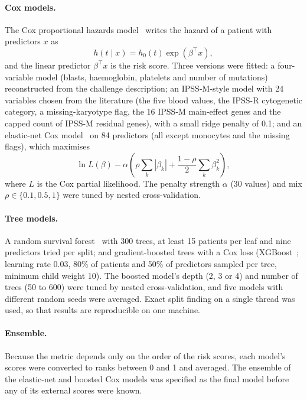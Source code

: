 \documentclass[10pt,letterpaper]{article}
\begin{document}
\paragraph*{Cox models.} The Cox proportional hazards model~\cite{cox1972} writes the hazard
of a patient with predictors $x$ as
\begin{equation}
h(t \mid x) = h_0(t)\exp\left(\beta^{\top} x\right),
\label{eq:cox}
\end{equation}
and the linear predictor $\beta^{\top} x$ is the risk score. Three versions were fitted: a
four-variable model (blasts, haemoglobin, platelets and number of mutations) reconstructed
from the challenge description; an IPSS-M-style model with 24 variables chosen from the
literature (the five blood values, the IPSS-R cytogenetic category, a missing-karyotype
flag, the 16 IPSS-M main-effect genes and the capped count of IPSS-M residual genes), with
a small ridge penalty of 0.1; and an elastic-net Cox model~\cite{zou2005,simon2011} on 84
predictors (all except monocytes and the missing flags), which maximises
\begin{equation}
\ln L(\beta) - \alpha\left(\rho \sum_{k} |\beta_k| + \frac{1-\rho}{2}\sum_{k} \beta_k^{2}\right),
\label{eq:enet}
\end{equation}
where $L$ is the Cox partial likelihood. The penalty strength $\alpha$ (30 values) and mix
$\rho \in \{0.1, 0.5, 1\}$ were tuned by nested cross-validation.

\paragraph*{Tree models.} A random survival forest~\cite{ishwaran2008} with 300 trees,
at least 15 patients per leaf and nine predictors tried per split; and gradient-boosted
trees with a Cox loss (XGBoost~\cite{chen2016}; learning rate 0.03, 80\% of patients and
50\% of predictors sampled per tree, minimum child weight 10). The boosted model's depth
(2, 3 or 4) and number of trees (50 to 600) were tuned by nested cross-validation, and five
models with different random seeds were averaged. Exact split finding on a single thread
was used, so that results are reproducible on one machine.

\paragraph*{Ensemble.} Because the metric depends only on the order of the risk scores,
each model's scores were converted to ranks between 0 and 1 and averaged. The ensemble of
the elastic-net and boosted Cox models was specified as the final model before any of its
external scores were known.
\end{document}
